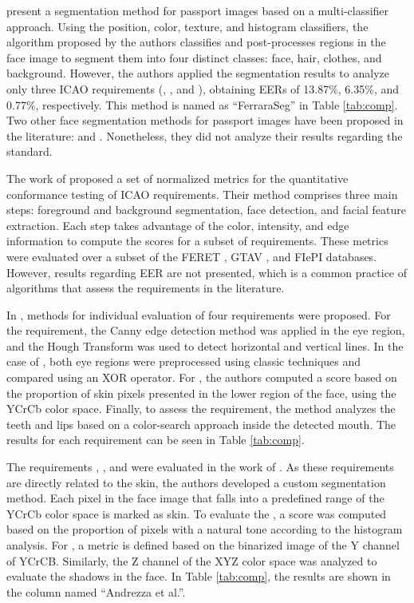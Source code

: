 \cite{ferrara2012multi} present a segmentation method for passport images based on a multi-classifier approach. Using the position, color, texture, and histogram classifiers, the algorithm proposed by the authors classifies and post-processes regions in the face image to segment them into four distinct classes: face, hair, clothes, and background. However, the authors applied the segmentation results to analyze only three ICAO requirements (\hairacrosseyes, \variedbackground, and \flashskin), obtaining EERs of 13.87\%, 6.35\%, and 0.77\%, respectively. This method is named as ``FerraraSeg'' in Table \ref{tab:comp}. Two other face segmentation methods for passport images have been proposed in the literature: \cite{hirzer2009automatic} and \cite{subasic2009expert}. Nonetheless, they did not analyze their results regarding the \icao standard.
 
The work of \citet{nguyen2013automated} proposed a set of normalized metrics for the quantitative conformance testing of ICAO requirements. Their method comprises three main steps: foreground and background segmentation, face detection, and facial feature extraction. Each step takes advantage of the color, intensity, and edge information to compute the scores for a subset of requirements. These metrics were evaluated over a subset of the FERET \citep{phillips1998feret}, GTAV \citep{tarres2012gtav}, and FIePI databases. However, results regarding EER are not presented, which is a common practice of algorithms that assess the \icao requirements in the literature.
 
In \cite{parente2016assessing}, methods for individual evaluation of four requirements were proposed. For the \pixelation requirement, the Canny edge detection method was applied in the eye region, and the Hough Transform was used to detect horizontal and vertical lines. In the case of \hairacrosseyes, both eye regions were preprocessed using classic techniques and compared using an XOR operator. For \veiloverface, the authors computed a score based on the proportion of skin pixels presented in the lower region of the face, using the YCrCb color space. Finally, to assess the \mouthopen requirement, the method analyzes the teeth and lips based on a color-search approach inside the detected mouth. The results for each requirement can be seen in Table \ref{tab:comp}.
 
The requirements \unnaturalskintone, \shadowsacrossface, and \flashskin were evaluated in the work of \citet{andrezza2016facial}. As these requirements are directly related to the skin, the authors developed a custom segmentation method. Each pixel in the face image that falls into a predefined range of the YCrCb color space is marked as skin. To evaluate the \unnaturalskintone, a score was computed based on the proportion of pixels with a natural tone according to the histogram analysis. For \flashskin, a metric is defined based on the binarized image of the Y channel of YCrCB. Similarly, the Z channel of the XYZ color space was analyzed to evaluate the shadows in the face. In Table \ref{tab:comp}, the results are shown in the column named ``Andrezza et al.''.
 
